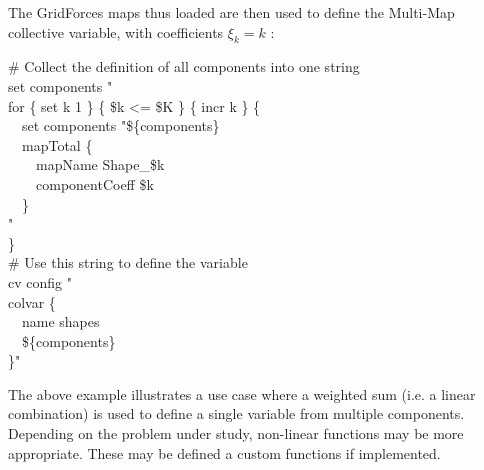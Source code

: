 {The GridForces maps thus loaded are then used to define the Multi-Map collective variable, with coefficients $\xi_k = k$ \cite{Fiorin2020}:\\
\begin{mdexampleinput}
  \-\# Collect the definition of all components into one string\\
  \-set components "\\
  \-for \{ set k 1 \} \{ \$k <= \$K \} \{ incr k \} \{\\
  \-~~set components "\$\{components\}\\
  \-~~mapTotal \{\\
  \-~~~~mapName Shape\_\$k\\
  \-~~~~componentCoeff \$k\\
  \-~~\}\\
  \-"\\
  \-\}\\
  \-\# Use this string to define the variable\\
  \-cv config "\\
  \-colvar \{\\
  \-\-~~name shapes\\
  \-\-~~\$\{components\}\\
  \-\}"
\end{mdexampleinput}


The above example illustrates a use case where a weighted sum (i.e.{} a linear combination) is used to define a single variable from multiple components.
Depending on the problem under study, non-linear functions may be more appropriate.
These may be defined a custom functions if implemented.
}



